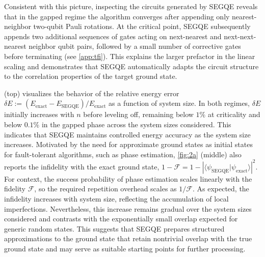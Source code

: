 Consistent with this picture, inspecting the circuits generated by SEGQE reveals that in the gapped regime the algorithm converges after appending only nearest-neighbor two-qubit Pauli rotations. At the critical point, SEGQE subsequently appends two additional sequences of gates acting on next-nearest and next-next-nearest neighbor qubit pairs, followed by a small number of corrective gates before terminating (see \cref{app:tfi}). This explains the larger prefactor in the linear scaling and demonstrates that SEGQE automatically adapts the circuit structure to the correlation properties of the target ground state. %

 (top) visualizes the behavior of the relative energy error $\delta E:=(E_\mathrm{exact}{-}E_\mathrm{SEGQE})/E_\mathrm{exact}$ as a function of system size. In both regimes, $\delta E$ initially increases with $n$ before leveling off, remaining below $1\%$ at criticality and below $0.1\%$ in the gapped phase across the system sizes considered. This indicates that SEGQE maintains controlled energy accuracy as the system size increases. 
Motivated by the need for approximate ground states as initial states for fault-tolerant algorithms, such as phase estimation, \cref{fig:2a} (middle) also reports the infidelity with the exact ground state, $1-\mathcal{F}=1-\left|\langle \psi_\mathrm{SEGQE}|\psi_\mathrm{exact}\rangle \right|^2$. For context, the success probability of phase estimation scales linearly with the fidelity $\mathcal{F}$, so the required repetition overhead scales as $1/\mathcal{F}$. As expected, the infidelity increases with system size, reflecting the accumulation of local imperfections. Nevertheless, this increase remains gradual over the system sizes considered and contrasts with the exponentially small overlap expected for generic random states. This suggests that SEGQE prepares structured approximations to the ground state that retain nontrivial overlap with the true ground state and may serve as suitable starting points for further processing.

